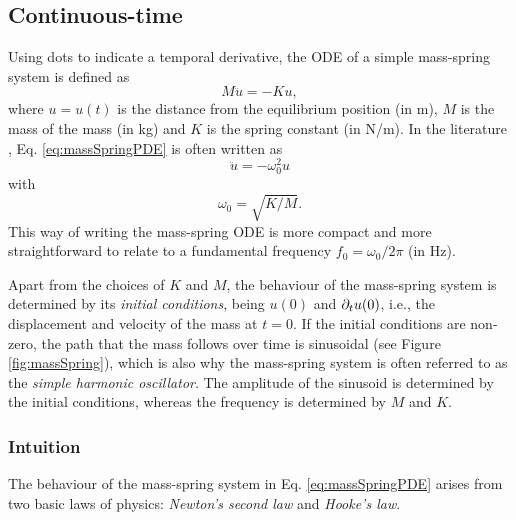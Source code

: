 \subsection{Continuous-time}
Using dots to indicate a temporal derivative, the ODE of a simple mass-spring system is defined as
\begin{equation}\label{eq:massSpringPDE}
    M\ddot u = -Ku,
\end{equation}
where $u = u(t)$ is the distance from the equilibrium position (in m), $M$ \SWcomment[$>0$] is the mass of the mass (in kg) and $K$ \SWcomment[$\geq 0$] is the spring constant (in N/m). In the literature \cite{theBible, }, Eq. \eqref{eq:massSpringPDE} is often written as
\begin{equation}
    \ddot u = -\omega_0^2u
\end{equation}
with 
\begin{equation}\label{eq:omega0MassSpring}
    \omega_0 = \sqrt{K/M}.
\end{equation}
This way of writing the mass-spring ODE is more compact and more straightforward to relate to a fundamental frequency $f_0 = \omega_0 / 2 \pi$ (in Hz). 

Apart from the choices of $K$ and $M$, the behaviour of the mass-spring system is determined by its \textit{initial conditions}, being $u(0)$ and $\partial_t u(0)$, i.e., the displacement and velocity of the mass at $t = 0$. If the initial conditions are non-zero, the path that the mass follows over time is sinusoidal (see Figure \ref{fig:massSpring}), which is also why the mass-spring system is often referred to as the \textit{simple harmonic oscillator}. The amplitude of the sinusoid is determined by the initial conditions, whereas the frequency is determined by $M$ and $K$. 



\subsubsection{Intuition}
The behaviour of the mass-spring system in Eq. \eqref{eq:massSpringPDE} arises from two basic laws of physics: \textit{Newton's second law} and \textit{Hooke's law}. 

